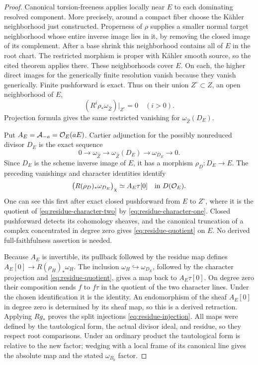 \begin{proof}
Canonical torsion-freeness
\cite[Theorem~2.9 and Proposition~2.11]{Fujino2023AnalyticVanishing}
applies locally near \(E\) to each dominating resolved component.  More
precisely, around a compact fiber choose the K\"ahler neighborhood just
constructed.  Properness of \(\rho\) supplies a smaller normal target
neighborhood whose entire inverse image lies in it, by removing the
closed image of its complement.  After a base shrink this neighborhood
contains all of \(E\) in the root chart.  The restricted morphism is
proper with K\"ahler smooth source, so the cited theorem applies there.
These neighborhoods cover \(E\).  On each, the higher direct images for
the generically finite resolution vanish because they vanish generically.
Finite pushforward is exact.  Thus on their union \(Z^\circ\subset Z\),
an open neighborhood of \(E\),
\[
 (R^i\rho_*\omega_{\widehat Z})|_{Z^\circ}=0\quad(i>0).
\]
Projection formula gives the same restricted vanishing for
\(\omega_{\widehat Z}(D_E)\).

Put \(A_E=\mathcal A_{-a}=\mathcal O_E(aE)\).  Cartier adjunction for the
possibly nonreduced divisor \(D_E\) is the exact sequence
\[
 0\longrightarrow\omega_{\widehat Z}\longrightarrow
 \omega_{\widehat Z}(D_E)\longrightarrow\omega_{D_E}\longrightarrow0.
\]
Since \(D_E\) is the scheme inverse image of \(E\), it has a morphism
\(\rho_D:D_E\to E\).  The preceding vanishings and character identities
identify
\begin{equation}\label{eq:residue-quotient}
 \bigl(R(\rho_D)_*\omega_{D_E}\bigr)_\chi\simeq A_E\tau[0]
 \quad\text{in }D(\mathcal O_E).
\end{equation}
One can see this first after exact closed pushforward from \(E\) to
\(Z^\circ\), where it
is the quotient of \eqref{eq:residue-character-two} by
\eqref{eq:residue-character-one}.  Closed pushforward detects its
cohomology sheaves, and the canonical truncation of a complex concentrated
in degree zero gives \eqref{eq:residue-quotient} on \(E\).  No derived
full-faithfulness assertion is needed.

Because \(A_E\) is invertible, its pullback followed by the residue map
defines \(A_E[0]\to R(\rho_H)_*\omega_H\).  The inclusion
\(\omega_H\hookrightarrow\omega_{D_E}\), followed by the character
projection and \eqref{eq:residue-quotient}, gives a map back to
\(A_E\tau[0]\).  On degree zero their composition sends \(f\) to
\(f\tau\) in the quotient of the two character lines.  Under the chosen
identification it is the identity.  An endomorphism of the sheaf
\(A_E[0]\) in degree zero is determined by its sheaf map, so this is a
derived retraction.  Applying \(Rg_*\) proves the split injections
\eqref{eq:residue-injection}.  All maps were defined by the tautological
form, the actual divisor ideal, and residue, so they respect root
comparisons.  Under an ordinary product the tautological form is relative
to the new factor; wedging with a local frame of its canonical line gives
the absolute map and the stated \(\omega_{B_0}\) factor.
\end{proof}

